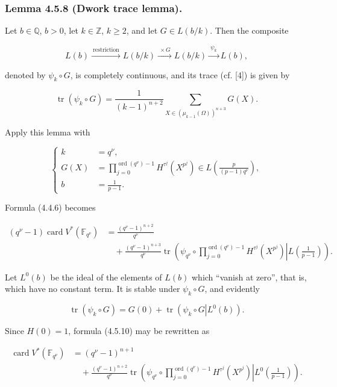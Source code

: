 \subsubsection*{Lemma 4.5.8 (Dwork trace lemma).}
Let $b\in\mathbb Q$, $b>0$, let $k\in\mathbb Z$, $k\geq2$, and let
$G\in L(b/k)$. Then the composite

\[
L(b)\xrightarrow{\ \text{restriction}\ }L(b/k)
\xrightarrow{\ \times G\ }L(b/k)
\xrightarrow{\ \psi_k\ }L(b),
\]

denoted by $\psi_k\circ G$, is completely continuous, and its trace
(cf. [4]) is given by

\begin{equation}\tag{4.5.9}
\operatorname{tr}(\psi_k\circ G)
=\frac1{(k-1)^{n+2}}
\sum_{X\in(\mu_{k-1}(\Omega))^{n+3}}G(X).
\end{equation}

Apply this lemma with

\[
\left\{
\begin{aligned}
k&=q^\nu,\\
G(X)&=\prod_{j=0}^{\operatorname{ord}(q^\nu)-1}
H^{\tau^j}(X^{p^j})
\in L\!\left(\frac{p}{(p-1)q^\nu}\right),\\
b&=\frac1{p-1}.
\end{aligned}
\right.
\]

Formula (4.4.6) becomes

\begin{equation}\tag{4.5.10}
\begin{aligned}
(q^\nu-1)\operatorname{card}V^*(\mathbb F_{q^\nu})
&=\frac{(q^\nu-1)^{n+2}}{q^\nu}\\
&\quad+\frac{(q^\nu-1)^{n+3}}{q^\nu}
\operatorname{tr}\!\left(
\left.\psi_{q^\nu}\circ
\prod_{j=0}^{\operatorname{ord}(q^\nu)-1}H^{\tau^j}(X^{p^j})
\right|L\!\left(\frac1{p-1}\right)\right).
\end{aligned}
\end{equation}

Let $L^0(b)$ be the ideal of the elements of $L(b)$ which ``vanish at
zero'', that is, which have no constant term. It is stable under
$\psi_k\circ G$, and evidently

\begin{equation}\tag{4.5.11}
\operatorname{tr}(\psi_k\circ G)
=G(0)+\operatorname{tr}\!\left(\left.\psi_k\circ G\right|L^0(b)\right).
\end{equation}

Since $H(0)=1$, formula (4.5.10) may be rewritten as

\begin{equation}\tag{4.5.12}
\begin{aligned}
\operatorname{card}V^*(\mathbb F_{q^\nu})
&=(q^\nu-1)^{n+1}\\
&\quad+\frac{(q^\nu-1)^{n+2}}{q^\nu}
\operatorname{tr}\!\left(
\left.\psi_{q^\nu}\circ
\prod_{j=0}^{\operatorname{ord}(q^\nu)-1}H^{\tau^j}(X^{p^j})
\right|L^0\!\left(\frac1{p-1}\right)\right).
\end{aligned}
\end{equation}

